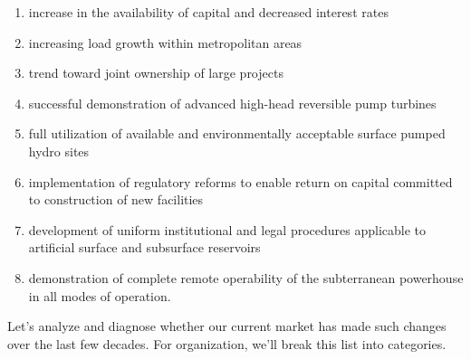 \documentclass[hidelinks,12pt,a4paper]{article}
\begin{document}
{\footnotesize
\begin{enumerate}
    \item increase in the availability of capital and decreased interest rates
    \item increasing load growth within metropolitan areas
    \item trend toward joint ownership of large projects
    \item successful demonstration of advanced high-head reversible pump turbines
    \item full utilization of available and environmentally acceptable surface pumped hydro sites
    \item implementation of regulatory reforms to enable return on capital committed to construction of new facilities
    \item development of uniform institutional and legal procedures applicable to artificial surface and subsurface reservoirs
    \item demonstration of complete remote operability of the subterranean powerhouse in all modes of operation.
\end{enumerate}
}

Let's analyze and diagnose whether our current market has made such changes over the last few decades. For organization, we'll break this list into categories.
\end{document}
